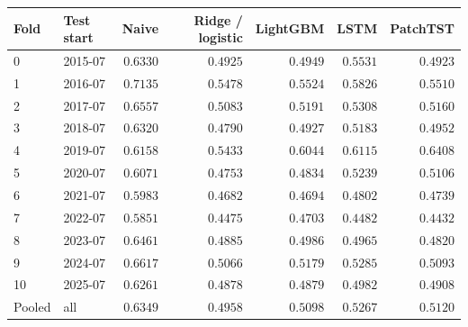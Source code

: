 \begin{tabular}{llrrrrr}
\toprule
Fold & Test start & Naive & Ridge / logistic & LightGBM & LSTM & PatchTST \\
\midrule
0 & 2015-07 & $0.6330$ & $0.4925$ & $0.4949$ & $0.5531$ & $0.4923$ \\
1 & 2016-07 & $0.7135$ & $0.5478$ & $0.5524$ & $0.5826$ & $0.5510$ \\
2 & 2017-07 & $0.6557$ & $0.5083$ & $0.5191$ & $0.5308$ & $0.5160$ \\
3 & 2018-07 & $0.6320$ & $0.4790$ & $0.4927$ & $0.5183$ & $0.4952$ \\
4 & 2019-07 & $0.6158$ & $0.5433$ & $0.6044$ & $0.6115$ & $0.6408$ \\
5 & 2020-07 & $0.6071$ & $0.4753$ & $0.4834$ & $0.5239$ & $0.5106$ \\
6 & 2021-07 & $0.5983$ & $0.4682$ & $0.4694$ & $0.4802$ & $0.4739$ \\
7 & 2022-07 & $0.5851$ & $0.4475$ & $0.4703$ & $0.4482$ & $0.4432$ \\
8 & 2023-07 & $0.6461$ & $0.4885$ & $0.4986$ & $0.4965$ & $0.4820$ \\
9 & 2024-07 & $0.6617$ & $0.5066$ & $0.5179$ & $0.5285$ & $0.5093$ \\
10 & 2025-07 & $0.6261$ & $0.4878$ & $0.4879$ & $0.4982$ & $0.4908$ \\
\midrule Pooled & all & $0.6349$ & $0.4958$ & $0.5098$ & $0.5267$ & $0.5120$ \\
\bottomrule
\end{tabular}
